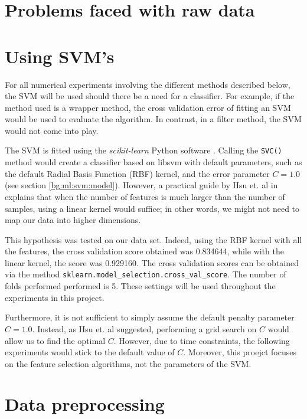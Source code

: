 \documentclass[12pt, twoside, a4paper]{report}
\begin{document}
\section{Problems faced with raw data}

\section{Using SVM's}


For all numerical experiments involving the different methods described below, the SVM will be used should there be a need for a classifier. For example, if the method used is a wrapper method, the cross validation error of fitting an SVM would be used to evaluate the algorithm. In contrast, in a filter method, the SVM would not come into play.

The SVM is fitted using the \textit{scikit-learn} Python software \cite{scikit-learn}. Calling the \texttt{SVC()} method would create a classifier based on libsvm \cite{libsvm} with default parameters, such as the default Radial Basis Function (RBF) kernel, and the error parameter $C=1.0$ (see section \ref{bg:ml:svm:model}). However, a practical guide by Hsu et. al in \cite{RefWorks:128} explains that when the number of features is much larger than the number of samples, using a linear kernel would suffice; in other words, we might not need to map our data into higher dimensions.

This hypothesis was tested on our data set. Indeed, using the RBF kernel with all the features, the cross validation score obtained was 0.834644, while with the linear kernel, the score was 0.929160. The cross validation scores can be obtained via the method \texttt{sklearn.model\_selection.cross\_val\_score}. The number of folds performed performed is 5. These settings will be used throughout the experiments in this project.

Furthermore, it is not sufficient to simply assume the default penalty parameter $C=1.0$. Instead, as Hsu et. al suggested, performing a grid search on $C$ would allow us to find the optimal $C$. However, due to time constraints, the following experiments would stick to the default value of $C$. Moreover, this proejct focuses on the feature selection algorithms, not the parameters of the SVM.

\section{Data preprocessing}
\end{document}
